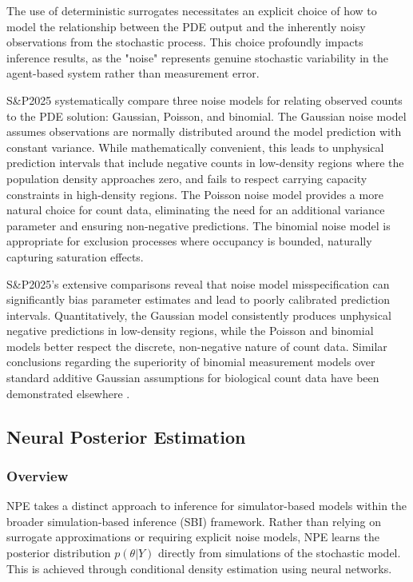 \documentclass{article}
\newcommand{\SP}{S\&P2025}
\begin{document}
The use of deterministic surrogates necessitates an explicit choice of how to model the relationship between the PDE output and the inherently noisy observations from the stochastic process. This choice profoundly impacts inference results, as the "noise" represents genuine stochastic variability in the agent-based system rather than measurement error.

\SP{} systematically compare three noise models for relating observed counts to the PDE solution: Gaussian, Poisson, and binomial. The Gaussian noise model assumes observations are normally distributed around the model prediction with constant variance. While mathematically convenient, this leads to unphysical prediction intervals that include negative counts in low-density regions where the population density approaches zero, and fails to respect carrying capacity constraints in high-density regions. The
Poisson noise model provides a more natural choice for count data, eliminating the need for an additional variance parameter and ensuring non-negative predictions. The binomial noise model is appropriate for exclusion processes where occupancy is bounded, naturally capturing saturation effects.

\SP's extensive comparisons reveal that noise model misspecification can significantly bias parameter estimates and lead to poorly calibrated prediction intervals. Quantitatively, the Gaussian model consistently produces unphysical negative predictions in low-density regions, while the Poisson and binomial models better respect the discrete, non-negative nature of count data. Similar conclusions regarding the superiority of binomial measurement models over standard additive Gaussian assumptions for biological count data have been demonstrated elsewhere \citep{SIMPSON2024111732}.



\subsection{Neural Posterior Estimation}\label{sec:NPE}

\subsubsection{Overview}
NPE \citep{papamakarios2016fast, greenberg2019automatic,Cranmer2020FrontierSBI} takes a distinct approach to inference for simulator-based models within the broader simulation-based inference (SBI) framework. Rather than relying on surrogate approximations or requiring explicit noise models, NPE learns the posterior distribution $p(\theta | Y)$ directly from simulations of the stochastic model. This is achieved through conditional density estimation using neural networks.
\end{document}
